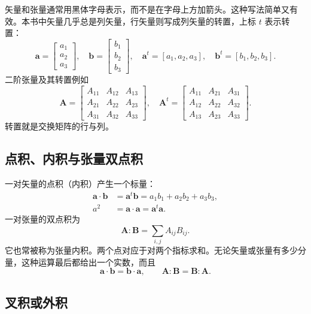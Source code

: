 \documentclass[11pt,a4paper,openany,fontset=none]{ctexbook}
\begin{document}
矢量和张量通常用黑体字母表示，而不是在字母上方加箭头。这种写法简单又有效。本书中矢量几乎总是列矢量，行矢量则写成列矢量的转置，上标 $t$ 表示转置：
\begin{equation}
 \bm a=\begin{bmatrix}a_1\\a_2\\a_3\end{bmatrix},\quad
 \bm b=\begin{bmatrix}b_1\\b_2\\b_3\end{bmatrix},\quad
 \bm a^t=[a_1,a_2,a_3],\quad \bm b^t=[b_1,b_2,b_3]. \tag{1.2.1}
\end{equation}
二阶张量及其转置例如
\begin{equation}
 \bm A=\begin{bmatrix}A_{11}&A_{12}&A_{13}\\A_{21}&A_{22}&A_{23}\\A_{31}&A_{32}&A_{33}\end{bmatrix},\quad
 \bm A^t=\begin{bmatrix}A_{11}&A_{21}&A_{31}\\A_{12}&A_{22}&A_{32}\\A_{13}&A_{23}&A_{33}\end{bmatrix}. \tag{1.2.2}
\end{equation}
转置就是交换矩阵的行与列。

\subsection{点积、内积与张量双点积}

一对矢量的点积（内积）产生一个标量：
\begin{align}
 \bm a\cdot\bm b&=\bm a^t\bm b=a_1b_1+a_2b_2+a_3b_3, \tag{1.2.3}\\
 a^2&=\bm a\cdot\bm a=\bm a^t\bm a. \tag{1.2.4}
\end{align}
一对张量的双点积为
\begin{equation}
 \bm A:\bm B=\sum_{i,j}A_{ij}B_{ij}. \tag{1.2.5}
\end{equation}
它也常被称为张量内积。两个点对应于对两个指标求和。无论矢量或张量有多少分量，这种运算最后都给出一个实数，而且
\begin{equation}
 \bm a\cdot\bm b=\bm b\cdot\bm a,\qquad \bm A:\bm B=\bm B:\bm A. \tag{1.2.6}
\end{equation}

\subsection{叉积或外积}
\end{document}
